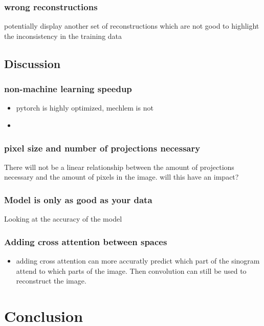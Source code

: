 \documentclass{article}
\begin{document}
\subsubsection{wrong reconstructions}

potentially display another set of reconstructions which are not good to highlight the inconsistency in the training data

\subsection{Discussion}

\subsubsection{non-machine learning speedup}

\begin{itemize}
\item pytorch is highly optimized, mechlem is not
\item
\end{itemize}

\subsubsection{pixel size and number of projections necessary}

There will not be a linear relationship between the amount of projections necessary and the amount of pixels in the image. will this have an impact?

\subsubsection{Model is only as good as your data}

Looking at the accuracy of the model

\subsubsection{Adding cross attention between spaces}

\begin{itemize}
\item adding cross attention can more accuratly predict which part of the sinogram attend to which parts of the image. Then convolution can still be used to reconstruct the image.
\end{itemize}

\section{Conclusion}

\clearpage

\end{document}
